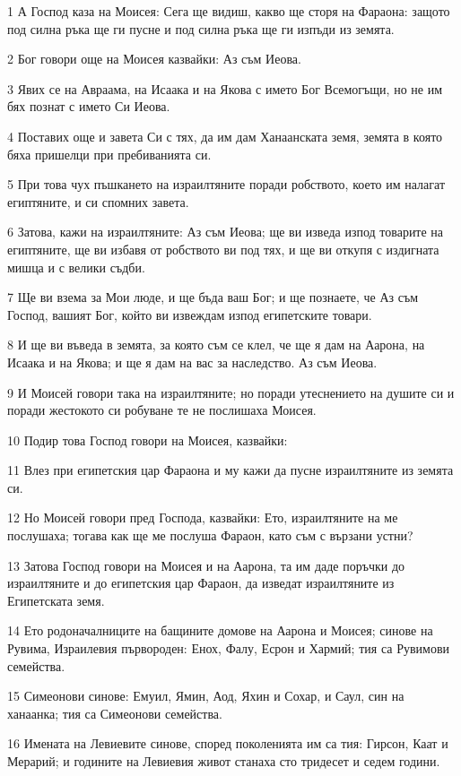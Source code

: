 \par 1 А Господ каза на Моисея: Сега ще видиш, какво ще сторя на Фараона: защото под силна ръка ще ги пусне и под силна ръка ще ги изпъди из земята.
\par 2 Бог говори още на Моисея казвайки: Аз съм Иеова.
\par 3 Явих се на Авраама, на Исаака и на Якова с името Бог Всемогъщи, но не им бях познат с името Си Иеова.
\par 4 Поставих още и завета Си с тях, да им дам Ханаанската земя, земята в която бяха пришелци при пребиванията си.
\par 5 При това чух пъшкането на израилтяните поради робството, което им налагат египтяните, и си спомних завета.
\par 6 Затова, кажи на израилтяните: Аз съм Иеова; ще ви изведа изпод товарите на египтяните, ще ви избавя от робството ви под тях, и ще ви откупя с издигната мишца и с велики съдби.
\par 7 Ще ви взема за Мои люде, и ще бъда ваш Бог; и ще познаете, че Аз съм Господ, вашият Бог, който ви извеждам изпод египетските товари.
\par 8 И ще ви въведа в земята, за която съм се клел, че ще я дам на Аарона, на Исаака и на Якова; и ще я дам на вас за наследство. Аз съм Иеова.
\par 9 И Моисей говори така на израилтяните; но поради утеснението на душите си и поради жестокото си робуване те не послишаха Моисея.
\par 10 Подир това Господ говори на Моисея, казвайки:
\par 11 Влез при египетския цар Фараона и му кажи да пусне израилтяните из земята си.
\par 12 Но Моисей говори пред Господа, казвайки: Ето, израилтяните на ме послушаха; тогава как ще ме послуша Фараон, като съм с вързани устни?
\par 13 Затова Господ говори на Моисея и на Аарона, та им даде поръчки до израилтяните и до египетския цар Фараон, да изведат израилтяните из Египетската земя.
\par 14 Ето родоначалниците на бащините домове на Аарона и Моисея; синове на Рувима, Израилевия първороден: Енох, Фалу, Есрон и Хармий; тия са Рувимови семейства.
\par 15 Симеонови синове: Емуил, Ямин, Аод, Яхин и Сохар, и Саул, син на ханаанка; тия са Симеонови семейства.
\par 16 Имената на Левиевите синове, според поколенията им са тия: Гирсон, Каат и Мерарий; и годините на Левиевия живот станаха сто тридесет и седем години.

